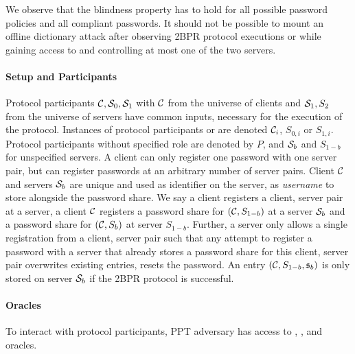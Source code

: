 We observe that the blindness property has to hold for all possible password policies and all compliant passwords. It should not be possible to mount an offline dictionary attack after observing \ac{2BPR} protocol executions or while gaining access to and controlling at most one of the two servers.

\paragraph{Setup and Participants}
Protocol participants $\mathcal{C},\mathcal{S}_0,\mathcal{S}_1$ with $\mathcal{C}$ from the universe of clients and $\mathcal{S}_1,S_2$ from the universe of servers have common inputs, necessary for the execution of the protocol. %
Instances of protocol participants \Client or \Server are denoted $\mathcal{C}_i$, $S_{0,i}$ or $S_{1,i}$.
Protocol participants without specified role are denoted by $P$, and $\mathcal{S}_b$ and $S_{1-b}$ for unspecified servers.
A client can only register one password with one server pair, but can register passwords at an arbitrary number of server pairs.
Client $\mathcal{C}$ and servers $\mathcal{S}_b$ are unique and used as identifier on the server, \ie as \emph{username} to store alongside the password share.
We say a client registers a client, server pair at a server, \ie a client $\mathcal{C}$ registers a password share for $(\mathcal{C}, S_{1-b})$ at a server $\mathcal{S}_b$ and a password share for $(\mathcal{C},S_{b})$ at server $S_{1-b}$.
Further, a server only allows a single registration from a client, server pair such that any attempt to register a password with a server that already stores a password share for this client, server pair overwrites existing entries, \ie resets the password.
An entry $(\mathcal{C},S_{1-b},\mathfrak{s}_b)$ is only stored on server $\mathcal{S}_b$ if the \ac{2BPR} protocol is successful.

\paragraph{Oracles}
To interact with protocol participants, \ac{PPT} adversary \cA has access to \Setup, \Send, \Execute and \Corrupt oracles.

